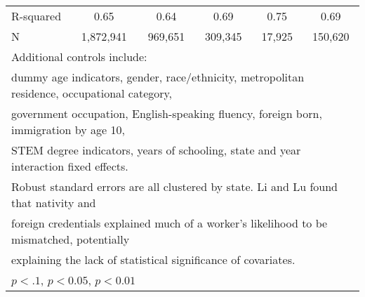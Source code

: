 \begin{table}[htbp]
\begin{tabular}{l*{5}{c}}
R-squared           &        0.65         &        0.64         &        0.69         &        0.75         &        0.69         \\
N                   &   1,872,941         &     969,651         &     309,345         &      17,925         &     150,620         \\
\bottomrule
\multicolumn{6}{l}{\footnotesize Additional controls include:}\\
\multicolumn{6}{l}{\footnotesize dummy age indicators, gender, race/ethnicity, metropolitan residence, occupational category,}\\
\multicolumn{6}{l}{\footnotesize government occupation, English-speaking fluency, foreign born, immigration by age 10,}\\
\multicolumn{6}{l}{\footnotesize STEM degree indicators, years of schooling, state and year interaction fixed effects.}\\
\multicolumn{6}{l}{\footnotesize Robust standard errors are all clustered by state. Li and Lu found that nativity and}\\
\multicolumn{6}{l}{\footnotesize foreign credentials explained much of a worker's likelihood to be mismatched, potentially}\\
\multicolumn{6}{l}{\footnotesize explaining the lack of statistical significance of covariates.}\\
\multicolumn{6}{l}{\footnotesize \sym{*} \(p<.1\), \sym{**} \(p<0.05\), \sym{***} \(p<0.01\)}\\
\end{tabular}
\end{table}
